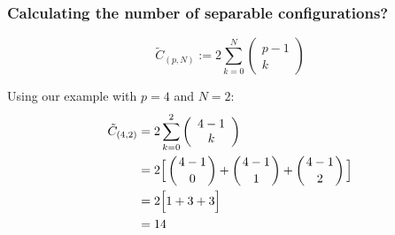 \begin{frame}\frametitle{Calculating the number of separable configurations?}

\begin{equation*}
	\tilde C_{(p,N)} := 2 \sum_{k=0}^{N} \left( \begin{array}{c}
	p-1\\
	k
	\end{array}\right)
\end{equation*}

Using our example with $p=4$ and $N=2$:
\begin{align}
	\tilde C_{(4,2)} &= 2 \sum_{k=0}^{2} \left( \begin{array}{c}
	4-1\\
	k
	\end{array}\right)\\
	&= 2 
	\Big\lbrack
	\left({4-1 \atop {\color{black}0}}\right)
	+
	\left({4-1 \atop {\color{black}1}}\right)
	+
	\left({4-1 \atop {\color{black}2}}\right)
	\Big\rbrack\\
	&= 2 \Big\lbrack
	1 + 3 + 3
	\Big\rbrack\\
	&= 14
\end{align}


\end{frame}

